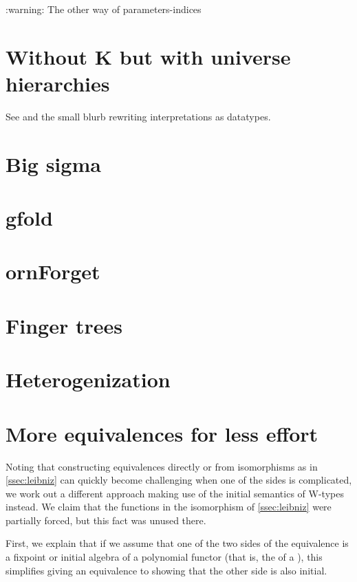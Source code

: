 
\begin{outline}
    :warning: The other way of parameters-indices
\end{outline}

\appendix

\section{Without K but with universe hierarchies}\label{app:withoutk}
See \cite{practgen} and the small blurb rewriting interpretations as datatypes.

\section{Big sigma}\label{app:large-sigma}

\section{gfold}\label{app:gfold}

\section{ornForget}\label{app:ornforget}

\section{Finger trees}
%

\section{Heterogenization}
%


\section{More equivalences for less effort}\label{sec:userfriendly}
Noting that constructing equivalences directly or from isomorphisms as in \autoref{ssec:leibniz} can quickly become challenging when one of the sides is complicated, we work out a different approach making use of the initial semantics of W-types instead. We claim that the functions in the isomorphism of \autoref{ssec:leibniz} were partially forced, but this fact was unused there.

First, we explain that if we assume that one of the two sides of the equivalence is a fixpoint or initial algebra of a polynomial functor (that is, the  of a ), this simplifies giving an equivalence to showing that the other side is also initial.

